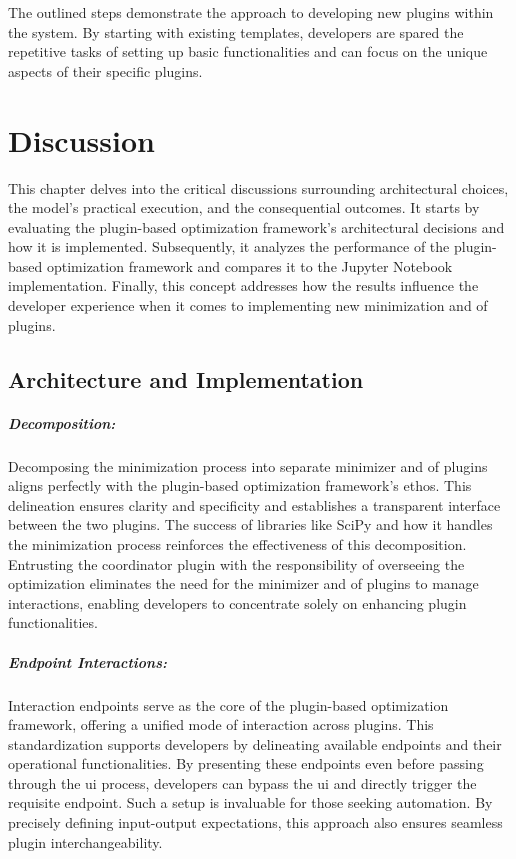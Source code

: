 \documentclass[
  a4paper,  %
  twoside,  %
  bibliography=totoc,
  headsepline,
  cleardoublepage=empty,
  parskip=half,
  draft=false
]{scrbook}
\begin{document}
The outlined steps demonstrate the approach to developing new plugins within the system.
By starting with existing templates, developers are spared the repetitive tasks of setting up basic functionalities and can focus on the unique aspects of their specific plugins.


\chapter{Discussion}
\label{chap:discussion}

This chapter delves into the critical discussions surrounding architectural choices, the model's practical execution, and the consequential outcomes.
It starts by evaluating the plugin-based optimization framework's architectural decisions and how it is implemented.
Subsequently, it analyzes the performance of the plugin-based optimization framework and compares it to the Jupyter Notebook implementation.
Finally, this concept addresses how the results influence the developer experience when it comes to implementing new minimization and \gls{of} plugins.

\section{Architecture and Implementation}
\paragraph{Decomposition:}
\label{sec:decomposition}

Decomposing the minimization process into separate minimizer and \gls{of} plugins aligns perfectly with the plugin-based optimization framework's ethos.
This delineation ensures clarity and specificity and establishes a transparent interface between the two plugins.
The success of libraries like SciPy and how it handles the minimization process \cite{Virtanen2020} reinforces the effectiveness of this decomposition.
Entrusting the coordinator plugin with the responsibility of overseeing the optimization eliminates the need for the minimizer and \gls{of} plugins to manage interactions, enabling developers to concentrate solely on enhancing plugin functionalities.

\paragraph{Endpoint Interactions:}
\label{sec:enpointinteractions}

Interaction endpoints serve as the core of the plugin-based optimization framework, offering a unified mode of interaction across plugins.
This standardization supports developers by delineating available endpoints and their operational functionalities.
By presenting these endpoints even before passing through the \gls{ui} process, developers can bypass the \gls{ui} and directly trigger the requisite endpoint.
Such a setup is invaluable for those seeking automation.
By precisely defining input-output expectations, this approach also ensures seamless plugin interchangeability.
\end{document}
